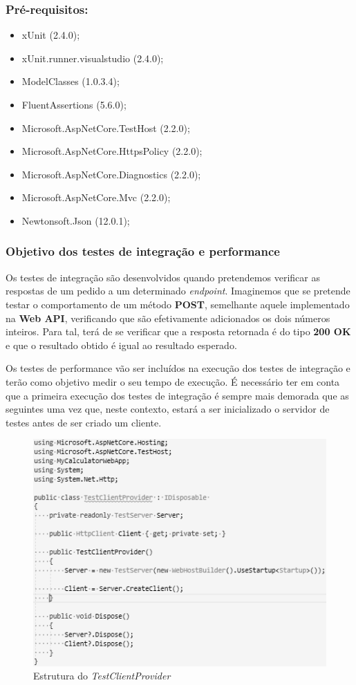 \subsubsection{Pré-requisitos:}

\begin{itemize}
 \item xUnit (2.4.0);
 \item xUnit.runner.visualstudio (2.4.0);
 \item ModelClasses (1.0.3.4);
 \item FluentAssertions (5.6.0);
 \item Microsoft.AspNetCore.TestHost (2.2.0);
 \item Microsoft.AspNetCore.HttpsPolicy (2.2.0);
 \item Microsoft.AspNetCore.Diagnostics (2.2.0);
 \item Microsoft.AspNetCore.Mvc (2.2.0);
 \item Newtonsoft.Json (12.0.1);
\end{itemize}

\subsubsection{Objetivo dos testes de integração e performance}

\hspace{1cm}Os testes de integração são desenvolvidos quando pretendemos verificar as respostas de um pedido a um determinado \textit{endpoint}. Imaginemos que se pretende testar o comportamento de um método \textbf{POST}, semelhante aquele implementado na \textbf{Web API}, verificando que são efetivamente adicionados os dois números inteiros. Para tal, terá de se verificar que a resposta retornada é do tipo \textbf{200 OK} e que o resultado obtido é igual ao resultado esperado.

\hspace{1cm}Os testes de performance vão ser incluídos na execução dos testes de integração e terão como objetivo medir o seu tempo de execução. É necessário ter em conta que a primeira execução dos testes de integração é sempre mais demorada que as seguintes uma vez que, neste contexto, estará a ser inicializado o servidor de testes antes de ser criado um cliente. 

\begin{figure}[hbt!]
\centering
\includegraphics[width=0.7\linewidth]{Cap5/VSTestServer.png}
\caption{Estrutura do \textit{TestClientProvider}}
\label{Fig:Fig50}
\end{figure}

